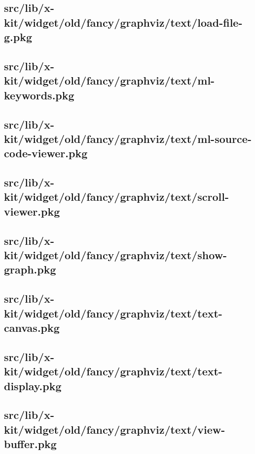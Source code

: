 \subsection{src/lib/x-kit/widget/old/fancy/graphviz/text/load-file-g.pkg}


\subsection{src/lib/x-kit/widget/old/fancy/graphviz/text/ml-keywords.pkg}


\subsection{src/lib/x-kit/widget/old/fancy/graphviz/text/ml-source-code-viewer.pkg}


\subsection{src/lib/x-kit/widget/old/fancy/graphviz/text/scroll-viewer.pkg}


\subsection{src/lib/x-kit/widget/old/fancy/graphviz/text/show-graph.pkg}


\subsection{src/lib/x-kit/widget/old/fancy/graphviz/text/text-canvas.pkg}


\subsection{src/lib/x-kit/widget/old/fancy/graphviz/text/text-display.pkg}


\subsection{src/lib/x-kit/widget/old/fancy/graphviz/text/view-buffer.pkg}


